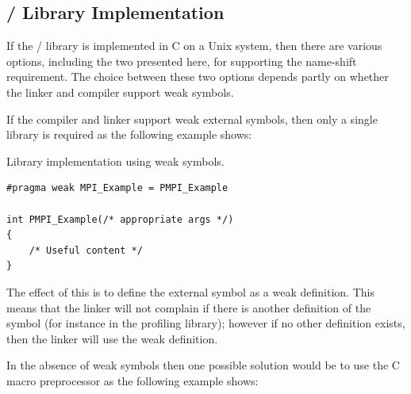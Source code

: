 \subsection{\texorpdfstring{\MPI/}{MPI} Library Implementation}

If the \MPI/ library is implemented in C on a Unix system, then there are
various options, including the two presented here, for supporting the
name-shift requirement.  The choice between these two options depends
partly on whether the linker and compiler support weak symbols.

If the compiler and linker support weak external symbols, then only 
a single library is required as the following example shows: 

\begin{example}
\label{exa:prof:weak-symbols}
Library implementation using weak symbols.
\begin{lstlisting}[language={[MPI]C}]
#pragma weak MPI_Example = PMPI_Example

int PMPI_Example(/* appropriate args */)
{
    /* Useful content */
}
\end{lstlisting}
\end{example}

The effect of this  is to define the external symbol
 as a weak definition.  This means that the linker will
not complain if there is another definition of the symbol (for instance in
the profiling library); however if no other definition exists, then the
linker will use the weak definition.

In the absence of weak symbols then one possible solution would be to use
the C macro preprocessor as the following example shows:

